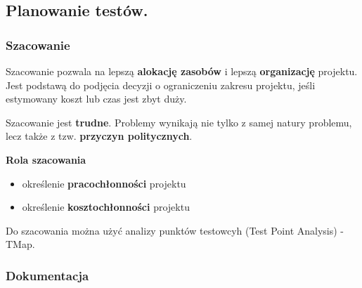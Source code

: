 \documentclass[../main.tex]{subfiles}
\begin{document}
    \subsection{Planowanie testów.}
    \subsubsection{Szacowanie}
    Szacowanie pozwala na lepszą \textbf{alokację zasobów} i lepszą \textbf{organizację} projektu. Jest podstawą do podjęcia
    decyzji o ograniczeniu zakresu projektu, jeśli estymowany koszt lub czas jest zbyt duży.

    Szacowanie jest \textbf{trudne}. Problemy wynikają nie tylko z samej natury problemu, lecz także z tzw. \textbf{przyczyn politycznych}.

    \textbf{Rola szacowania}
    \begin{itemize}
        \item określenie \textbf{pracochłonności} projektu
        \item określenie \textbf{kosztochłonności} projektu
    \end{itemize}

    Do szacowania można użyć analizy punktów testowcyh (Test Point Analysis) - TMap.

    \subsubsection{Dokumentacja}
\end{document}
